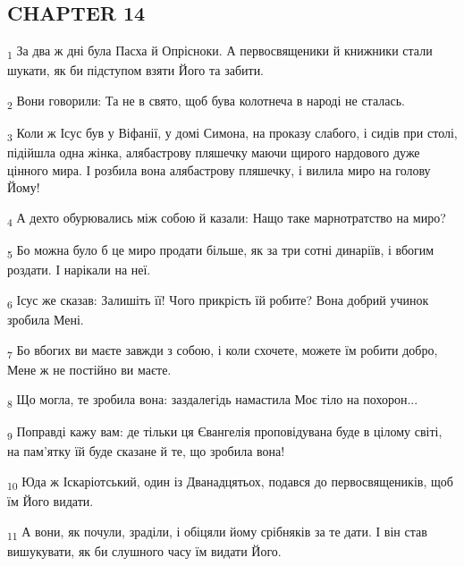 \subsection{CHAPTER 14}
\begin{tcolorbox}
\textsubscript{1} За два ж дні була Пасха й Опрісноки. А первосвященики й книжники стали шукати, як би підступом взяти Його та забити.
\end{tcolorbox}
\begin{tcolorbox}
\textsubscript{2} Вони говорили: Та не в свято, щоб бува колотнеча в народі не сталась.
\end{tcolorbox}
\begin{tcolorbox}
\textsubscript{3} Коли ж Ісус був у Віфанії, у домі Симона, на проказу слабого, і сидів при столі, підійшла одна жінка, алябастрову пляшечку маючи щирого нардового дуже цінного мира. І розбила вона алябастрову пляшечку, і вилила миро на голову Йому!
\end{tcolorbox}
\begin{tcolorbox}
\textsubscript{4} А дехто обурювались між собою й казали: Нащо таке марнотратство на миро?
\end{tcolorbox}
\begin{tcolorbox}
\textsubscript{5} Бо можна було б це миро продати більше, як за три сотні динаріїв, і вбогим роздати. І нарікали на неї.
\end{tcolorbox}
\begin{tcolorbox}
\textsubscript{6} Ісус же сказав: Залишіть її! Чого прикрість їй робите? Вона добрий учинок зробила Мені.
\end{tcolorbox}
\begin{tcolorbox}
\textsubscript{7} Бо вбогих ви маєте завжди з собою, і коли схочете, можете їм робити добро, Мене ж не постійно ви маєте.
\end{tcolorbox}
\begin{tcolorbox}
\textsubscript{8} Що могла, те зробила вона: заздалегідь намастила Моє тіло на похорон...
\end{tcolorbox}
\begin{tcolorbox}
\textsubscript{9} Поправді кажу вам: де тільки ця Євангелія проповідувана буде в цілому світі, на пам'ятку їй буде сказане й те, що зробила вона!
\end{tcolorbox}
\begin{tcolorbox}
\textsubscript{10} Юда ж Іскаріотський, один із Дванадцятьох, подався до первосвящеників, щоб їм Його видати.
\end{tcolorbox}
\begin{tcolorbox}
\textsubscript{11} А вони, як почули, зраділи, і обіцяли йому срібняків за те дати. І він став вишукувати, як би слушного часу їм видати Його.
\end{tcolorbox}
